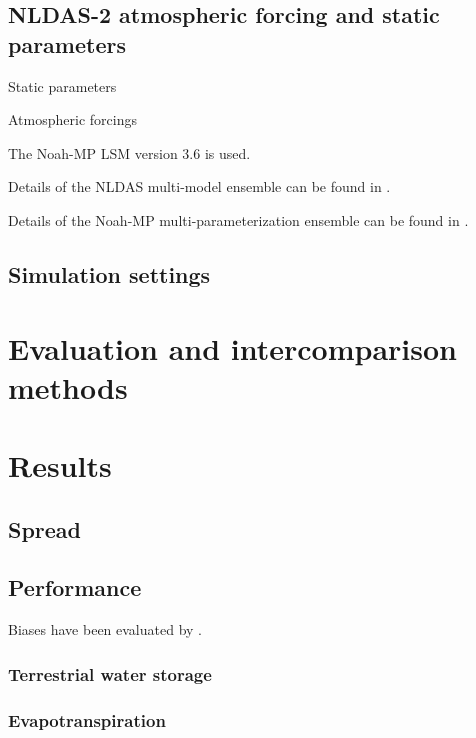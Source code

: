 \documentclass[essd]{copernicus}
\begin{document}
\subsection{NLDAS-2 atmospheric forcing and static parameters} \label{sec:data:nldas}

Static parameters

Atmospheric forcings

The Noah-MP LSM version 3.6 is used.

Details of the NLDAS multi-model ensemble can be found in
\citet{xia2012JGRA,xia2012JGRAa,fei2021WRR}.

Details of the Noah-MP multi-parameterization ensemble can be found in
\citet{zheng2019WRR,zheng2020JAMES,fei2021WRR}.


\subsection{Simulation settings} \label{sec:data:simulation}


\section{Evaluation and intercomparison methods} \label{sec:evaluation}


\section{Results} \label{sec:result}

\subsection{Spread}

\subsection{Performance}
Biases have been evaluated by \citet{zheng2020JAMES}.

\subsubsection{Terrestrial water storage}

\citep{landerer2012WRR}


\subsubsection{Evapotranspiration}
\end{document}
